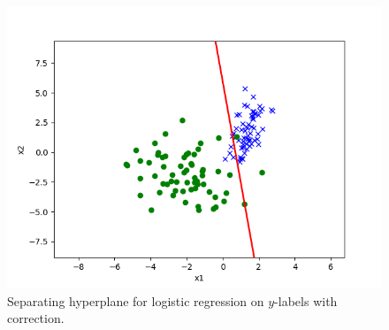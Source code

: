 \begin{answer}
	\begin{figure}[H]
		\centering
		\vspace{-2mm}
		\includegraphics[width=0.65\linewidth]{../src/posonly/posonly_adjusted_pred.png}
	\caption{Separating hyperplane for logistic regression on $y$-labels with correction. }
	\end{figure}
\end{answer}
